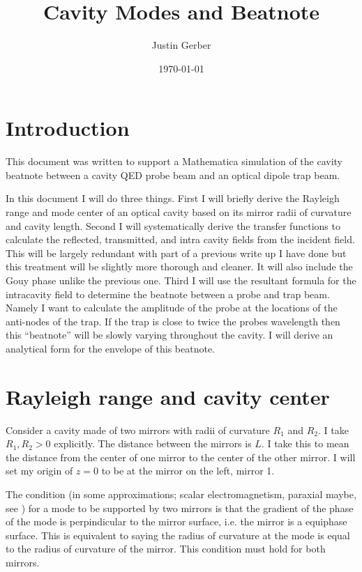 \documentclass[12pt]{article}
\begin{document}
\title{Cavity Modes and Beatnote}
\author{Justin Gerber}
\date{\today}
\maketitle

\section{Introduction}

This document was written to support a Mathematica simulation of the cavity beatnote between a cavity QED probe beam and an optical dipole trap beam.

In this document I will do three things. First I will briefly derive the Rayleigh range and mode center of an optical cavity based on its mirror radii of curvature and cavity length. Second I will systematically derive the transfer functions to calculate the reflected, transmitted, and intra cavity fields from the incident field. This will be largely redundant with part of a previous write up I have done but this treatment will be slightly more thorough and cleaner. It will also include the Gouy phase unlike the previous one. Third I will use the resultant formula for the intracavity field to determine the beatnote between a probe and trap beam. Namely I want to calculate the amplitude of the probe at the locations of the anti-nodes of the trap. If the trap is close to twice the probes wavelength then this ``beatnote'' will be slowly varying throughout the cavity. I will derive an analytical form for the envelope of this beatnote.

\section{Rayleigh range and cavity center}

Consider a cavity made of two mirrors with radii of curvature $R_1$ and $R_2$. I take $R_1,R_2>0$ explicitly. The distance between the mirrors is $L$. I take this to mean the distance from the center of one mirror to the center of the other mirror. I will set my origin of $z=0$ to be at the mirror on the left, mirror 1.

The condition (in some approximations; scalar electromagnetism, paraxial maybe, see \cite{Uphoff2015}) for a mode to be supported by two mirrors is that the gradient of the phase of the mode is perpindicular to the mirror surface, i.e. the mirror is a equiphase surface. This is equivalent to saying the radius of curvature at the mode is equal to the radius of curvature of the mirror. This condition must hold for both mirrors.
\end{document}
